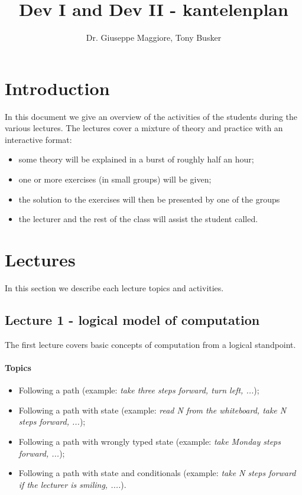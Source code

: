 \documentclass[12pt,a4paper,final]{article}
\author{Dr. Giuseppe Maggiore, Tony Busker}
\title{Dev I and Dev II - kantelenplan}
\begin{document}
\maketitle

\section{Introduction}
In this document we give an overview of the activities of the students during the various lectures. The lectures cover a mixture of theory and practice with an interactive format:
\begin{itemize}
\item some theory will be explained in a burst of roughly half an hour; 
\item one or more exercises (in small groups) will be given; 
\item the solution to the exercises will then be presented by one of the groups
\item the lecturer and the rest of the class will assist the student called.
\end{itemize}


\section{Lectures}
In this section we describe each lecture topics and activities.


\subsection{Lecture 1 - logical model of computation}
The first lecture covers basic concepts of computation from a logical standpoint.

\paragraph*{Topics}
\begin{itemize}
\item Following a path (example: \textit{take three steps forward, turn left, ...});
\item Following a path with state (example: \textit{read N from the whiteboard, take N steps forward, ...});
\item Following a path with wrongly typed state (example: \textit{take Monday steps forward, ...});
\item Following a path with state and conditionals (example: \textit{take N steps forward if the lecturer is smiling, ....}).
\end{itemize}
\end{document}
